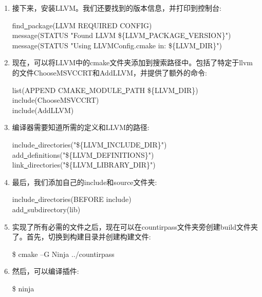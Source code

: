 \begin{enumerate}
\item 接下来，安装LLVM。我们还要找到的版本信息，并打印到控制台:
\begin{tcolorbox}[colback=white,colframe=black]
find\underline{~}package(LLVM REQUIRED CONFIG) \\
message(STATUS "Found LLVM \$\{LLVM\underline{~}PACKAGE\underline{~}VERSION\}") \\
message(STATUS "Using LLVMConfig.cmake in: \$\{LLVM\underline{~}DIR\}")
\end{tcolorbox}
	
\item 现在，可以将LLVM中的cmake文件夹添加到搜索路径中。包括了特定于llvm的文件ChooseMSVCCRT和AddLLVM，并提供了额外的命令:
\begin{tcolorbox}[colback=white,colframe=black]
list(APPEND CMAKE\underline{~}MODULE\underline{~}PATH \$\{LLVM\underline{~}DIR\}) \\
include(ChooseMSVCCRT) \\
include(AddLLVM)
\end{tcolorbox}
	
\item 编译器需要知道所需的定义和LLVM的路径:
\begin{tcolorbox}[colback=white,colframe=black]
include\underline{~}directories("\$\{LLVM\underline{~}INCLUDE\underline{~}DIR\}") \\
add\underline{~}definitions("\$\{LLVM\underline{~}DEFINITIONS\}") \\
link\underline{~}directories("\$\{LLVM\underline{~}LIBRARY\underline{~}DIR\}")
\end{tcolorbox}
	
\item 最后，我们添加自己的include和source文件夹:
\begin{tcolorbox}[colback=white,colframe=black]
include\underline{~}directories(BEFORE include) \\
add\underline{~}subdirectory(lib)
\end{tcolorbox}
	
\item 实现了所有必需的文件之后，现在可以在countirpass文件夹旁创建build文件夹了。首先，切换到构建目录并创建构建文件:
\begin{tcolorbox}[colback=white,colframe=black]
\$ cmake –G Ninja ../countirpass
\end{tcolorbox}
	
\item 然后，可以编译插件:
\begin{tcolorbox}[colback=white,colframe=black]
\$ ninja
\end{tcolorbox}
	

\end{enumerate}
